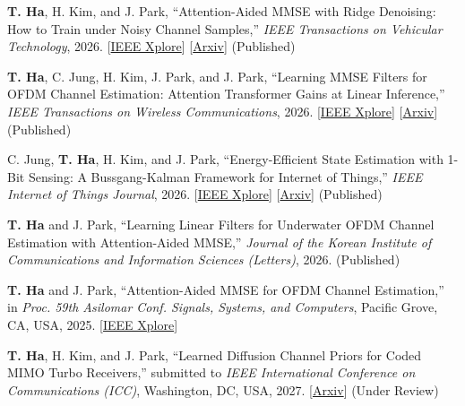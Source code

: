 \documentclass[a4paper,11pt]{article}
\begin{document}
\small{
\begin{enumerate}[
    leftmargin=*,
    labelsep=0.5em,
    align=left,
    widest={[\textbf{P.1}]},
    itemindent=0em,
    label={},
    itemsep=1.4mm
]

\item[\textbf{[J.1]}]
\textbf{T. Ha}, H. Kim, and J. Park,
``Attention-Aided MMSE with Ridge Denoising: How to Train under Noisy Channel Samples,''
\textit{IEEE Transactions on Vehicular Technology}, 2026.
[\href{https://ieeexplore.ieee.org/document/11727563}{IEEE Xplore}]
[\href{https://arxiv.org/abs/2608.15945}{Arxiv}]
(Published)

\item[\textbf{[J.2]}]
\textbf{T. Ha}, C. Jung, H. Kim, J. Park, and J. Park,
``Learning MMSE Filters for OFDM Channel Estimation: Attention Transformer Gains at Linear
Inference,''
\textit{IEEE Transactions on Wireless Communications}, 2026.
[\href{https://ieeexplore.ieee.org/document/11812749}{IEEE Xplore}]
[\href{https://arxiv.org/abs/2506.00452}{Arxiv}]
(Published)

\item[\textbf{[J.3]}]
C. Jung, \textbf{T. Ha}, H. Kim, and J. Park,
``Energy-Efficient State Estimation with 1-Bit Sensing: A Bussgang-Kalman Framework for
Internet of Things,''
\textit{IEEE Internet of Things Journal}, 2026.
[\href{https://ieeexplore.ieee.org/document/11661306}{IEEE Xplore}]
[\href{https://arxiv.org/abs/2507.17284}{Arxiv}]
(Published)

\item[\textbf{[J.4]}]
\textbf{T. Ha} and J. Park,
``Learning Linear Filters for Underwater OFDM Channel Estimation with Attention-Aided MMSE,''
\textit{Journal of the Korean Institute of Communications and Information Sciences (Letters)},
2026. (Published)

\item[\textbf{[C.1]}]
\textbf{T. Ha} and J. Park,
``Attention-Aided MMSE for OFDM Channel Estimation,''
in \textit{Proc. 59th Asilomar Conf. Signals, Systems, and Computers},
Pacific Grove, CA, USA, 2025.
[\href{https://ieeexplore.ieee.org/document/11443463}{IEEE Xplore}]

\item[\textbf{[C.2]}]
\textbf{T. Ha}, H. Kim, and J. Park,
``Learned Diffusion Channel Priors for Coded MIMO Turbo Receivers,'' submitted to \textit{IEEE International Conference on Communications (ICC)},
Washington, DC, USA, 2027.
[\href{https://arxiv.org/abs/2611.02486}{Arxiv}]
(Under Review)


\end{enumerate}}
\end{document}
